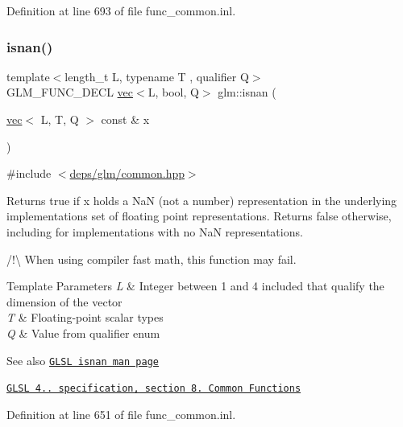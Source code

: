 Definition at line 693 of file func\+\_\+common.\+inl.

\mbox{\label{group__core__func__common_ga29ef934c00306490de837b4746b4e14d}} 
\subsubsection{\texorpdfstring{isnan()}{isnan()}}
{\footnotesize\ttfamily template$<$length\+\_\+t L, typename T , qualifier Q$>$ \\
G\+L\+M\+\_\+\+F\+U\+N\+C\+\_\+\+D\+E\+CL \hyperlink{structglm_1_1vec}{vec}$<$L, bool, Q$>$ glm\+::isnan (\begin{DoxyParamCaption}\item[{\hyperlink{structglm_1_1vec}{vec}$<$ L, T, Q $>$ const \&}]{x }\end{DoxyParamCaption})}



{\ttfamily \#include $<$\hyperlink{common_8hpp}{deps/glm/common.\+hpp}$>$}

Returns true if x holds a NaN (not a number) representation in the underlying implementation\textquotesingle{}s set of floating point representations. Returns false otherwise, including for implementations with no NaN representations.

/!\textbackslash{} When using compiler fast math, this function may fail.


\begin{DoxyTemplParams}{Template Parameters}
{\em L} & Integer between 1 and 4 included that qualify the dimension of the vector \\
\hline
{\em T} & Floating-\/point scalar types \\
\hline
{\em Q} & Value from qualifier enum\\
\hline
\end{DoxyTemplParams}
\begin{DoxySeeAlso}{See also}
\href{http://www.opengl.org/sdk/docs/manglsl/xhtml/isnan.xml}{\tt G\+L\+SL isnan man page} 

\href{http://www.opengl.org/registry/doc/GLSLangSpec.4.20.8.pdf}{\tt G\+L\+SL 4.. specification, section 8. Common Functions} 
\end{DoxySeeAlso}


Definition at line 651 of file func\+\_\+common.\+inl.

